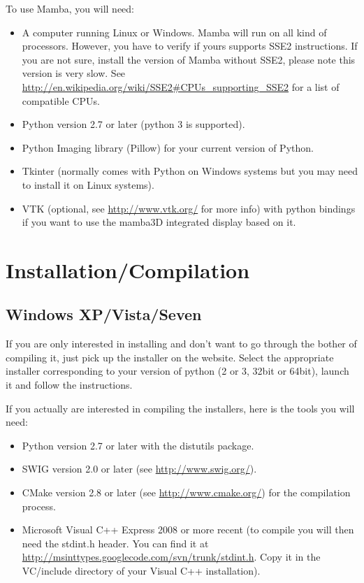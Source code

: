\documentclass[a4paper,10pt,oneside]{article}
\begin{document}
To use Mamba, you will need:
\begin{itemize}
\item A computer running Linux or Windows. Mamba will run on all kind of 
processors. However, you have to verify if yours supports SSE2 instructions. If you
are not sure, install the version of Mamba without SSE2, please note this version
is very slow. See \url{http://en.wikipedia.org/wiki/SSE2#CPUs_supporting_SSE2}
for a list of compatible CPUs.
\item Python version 2.7 or later (python 3 is supported).
\item Python Imaging library (Pillow) for your current version of Python.
\item Tkinter (normally comes with Python on Windows systems but you may need to
install it on Linux systems).
\item VTK (optional, see \url{http://www.vtk.org/} for more info) with python
bindings if you want to use the mamba3D integrated display based on it.
\end{itemize}


\pagebreak

\section{Installation/Compilation}
\label{cha:inst_comp}

\subsection{Windows XP/Vista/Seven}

If you are only interested in installing and don't want to go through the bother
of compiling it, just pick up the installer on the website. Select the appropriate
installer corresponding to your version of python (2 or 3, 32bit or 64bit), 
launch it and follow the instructions.

If you actually are interested in compiling the installers, here is the tools
you will need:

\begin{itemize}
\item Python version 2.7 or later with the distutils package.
\item SWIG version 2.0 or later (see \url{http://www.swig.org/}).
\item CMake version 2.8 or later (see \url{http://www.cmake.org/}) for the 
compilation process.
\item Microsoft Visual C++ Express 2008 or more recent (to compile you will then need
the stdint.h header. You can find it at 
\url{http://msinttypes.googlecode.com/svn/trunk/stdint.h}. Copy it in the VC/include 
directory of your Visual C++ installation).
\end{itemize}
\end{document}
